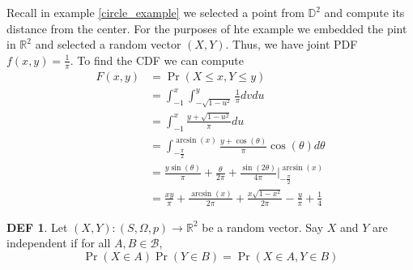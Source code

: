 \documentclass{article}
\theoremstyle{definition}\newtheorem{definition}{DEF}
\theoremstyle{lemma}\newtheorem{lemma}{Lemma}
\theoremstyle{corrolary}\newtheorem{corrolary}{Cor}
\begin{document}
\begin{example}
Recall in example \ref{circle_example} we selected a point from $\mathbb{D}^2$ and compute its distance from the center.
For the purposes of hte example we embedded the pint in $\mathbb{R}^2$ and selected a random vector $(X, Y)$.
Thus, we have joint PDF $f(x,y)=\frac{1}{\pi}$.
To find the CDF we can compute
\begin{align*}
F(x,y)
&= \Pr (X\leq x, Y\leq y) \\
&= \int_{-1}^x \int_{-\sqrt{1-u^2}}^y \frac{1}{\pi}dvdu\\
&= \int_{-1}^x \frac{y+\sqrt{1-u^2}}{\pi} du\\
&= \int_{-\frac{\pi}{2}}^{\arcsin(x)} \frac{y+\cos (\theta)}{\pi} \cos(\theta) d\theta\\
&=\frac{y\sin(\theta)}{\pi} + \frac{\theta}{2\pi} + \frac{\sin (2\theta)}{4\pi} |_{-\frac{\pi}{2}}^{\arcsin(x)} \\
&=\frac{xy}{\pi} + \frac{\arcsin(x)}{2\pi} + \frac{x\sqrt{1-x^2}}{2\pi} -\frac{y}{\pi} +\frac{1}{4}
\end{align*}
\end{example}

\begin{definition}
Let $(X,Y):(S,\Omega, p)\rightarrow \mathbb{R}^2$ be a random vector. Say $X$ and $Y$ are independent if for all $A,B\in \mathcal{B}$,
\begin{equation}
\Pr(X\in A)\Pr(Y\in B)=\Pr(X\in A, Y\in B)
\end{equation}
\end{definition}
\end{document}
